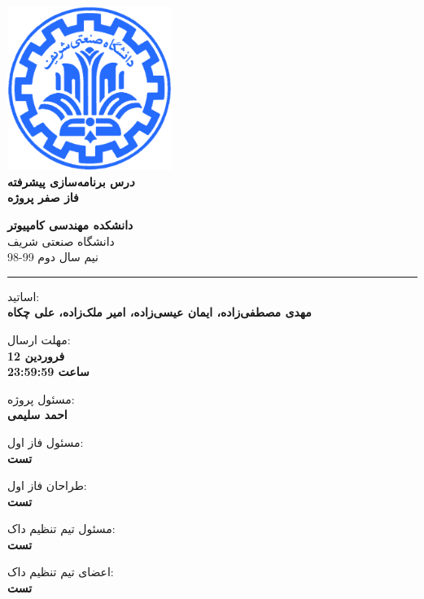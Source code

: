 \documentclass[]{article}
\begin{document}
\begin{titlepage}
\begin{center}
        
\vspace{0.7cm}

\includegraphics[width=0.4\textwidth]{sharif1.png}\\
\vspace{0.3cm}
\textbf{ \Huge{\emph درس برنامه‌سازی پیشرفته} }\\
\vspace{0.5cm}
\textbf{ \Large{ فاز صفر پروژه} }
\vspace{0.2cm}
       
 
      \large \textbf{دانشکده مهندسی کامپیوتر}\\\vspace{0.1cm}
    \large   دانشگاه صنعتی شریف\\\vspace{0.2cm}
       \large   ﻧﯿﻢ سال دوم 99-98 \\\vspace{0.10cm}
      \noindent\rule[1ex]{\linewidth}{1pt}
اساتید:\\
    \textbf{{مهدی مصطفی‌زاده، ایمان عیسی‌زاده، امیر ملک‌زاده، علی چکاه}}



    \vspace{0.20cm}

   مهلت ارسال:\\
    \textbf{{12 فروردین}}\\
    \textbf{{ساعت 23:59:59}}

    \vspace{0.10cm}
مسئول پروژه:\\
    \textbf{{احمد سلیمی}}
    
        \vspace{0.10cm}
مسئول فاز اول:\\
    \textbf{{تست}}
    
        \vspace{0.10cm}
طراحان فاز اول:\\
    \textbf{{تست}}
    
        \vspace{0.10cm}
مسئول تیم تنظیم داک:\\
    \textbf{{تست}}
    
            \vspace{0.10cm}
اعضای تیم تنظیم داک:\\
    \textbf{{تست}}
\end{center}
\end{titlepage}
\end{document}
